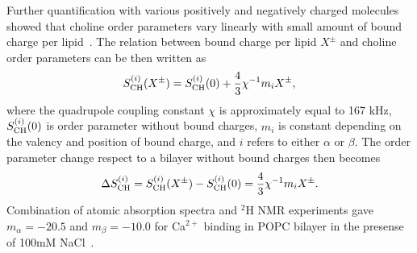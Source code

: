 \documentclass[pre,aps,floatfix,authordate1-4,twocolumn]{revtex4-1}
\begin{document}
Further quantification with various positively 
and negatively charged molecules showed that choline order parameters vary linearly 
with small amount of bound charge per lipid~\cite{altenbach84,altenbach85,seelig87,macdonald87,scherer89,roux90,beschiasvili91,marassi92,rydall92}.
The relation between bound charge per lipid $X^\pm$ and choline order parameters can be then written as~\cite{ferreira16}
\begin{equation}\label{electrometer_eq}
S_{\rm{CH}}^{(i)}(X^\pm)=S_{\rm{CH}}^{(i)}(0) + \frac{4}{3}\chi^{-1}m_i X^\pm,
\end{equation}
where the quadrupole coupling constant $\chi$ is approximately equal to 167 kHz,
$S_{\rm{CH}}^{(i)}(0)$ is order parameter without bound charges, $m_i$
is constant depending on the valency and position of bound charge, and $i$
refers to either $\alpha$ or $\beta$. The order parameter change respect to a 
bilayer without bound charges then becomes
\begin{equation}
\Delta S_{\rm{CH}}^{(i)}= S_{\rm{CH}}^{(i)}(X^\pm)-S_{\rm{CH}}^{(i)}(0) =\frac{4}{3}\chi^{-1}m_i X^\pm.
\end{equation}
Combination of atomic absorption spectra and $^2$H NMR experiments gave $m_\alpha=-20.5$ 
and $m_\beta=-10.0$ for Ca$^{2+}$ binding in POPC bilayer in the presense of 100mM NaCl~\cite{altenbach84}.
\end{document}
